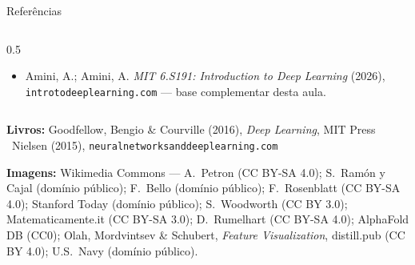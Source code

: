 \documentclass[aspectratio=169, 11pt]{beamer}
\begin{document}
\begin{frame}{Referências}
\begin{columns}[T]
\begin{column}{0.5\textwidth}
{\begin{itemize}
              (S26), Lecs.\ 1--2 — \texttt{deeplearning.cs.cmu.edu}
        \item Amini, A.; Amini, A. \emph{MIT 6.S191: Introduction to Deep
              Learning} (2026), \texttt{introtodeeplearning.com} — base
              complementar desta aula.
      \end{itemize}}
    \end{column}
  \end{columns}
  \smallskip
  \vspace{-0.3em}
  {\scriptsize \textbf{Livros:} Goodfellow, Bengio \& Courville (2016),
  \emph{Deep Learning}, MIT Press \textbullet\ Nielsen (2015),
  \texttt{neuralnetworksanddeeplearning.com}\par
  \textbf{Imagens:} Wikimedia Commons — A.\ Petron (CC BY-SA 4.0); S.\ Ramón
  y Cajal (domínio público); F.\ Bello (domínio público); F.\ Rosenblatt
  (CC BY-SA 4.0); Stanford Today (domínio público); S.\ Woodworth (CC BY 3.0);
  Matematicamente.it (CC BY-SA 3.0); D.\ Rumelhart (CC BY-SA 4.0); AlphaFold
  DB (CC0); Olah, Mordvintsev \& Schubert, \emph{Feature Visualization},
  distill.pub (CC BY 4.0); U.S.\ Navy (domínio público).\par}
\end{frame}
\end{document}
